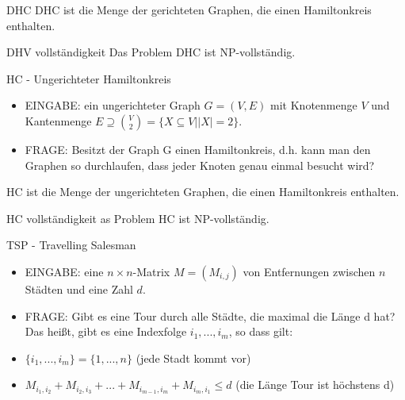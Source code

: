 \documentclass[avery5371]{flashcards}
\begin{document}
\begin{flashcard}[Definition]{DHC}
DHC ist die Menge der gerichteten Graphen, die einen Hamiltonkreis enthalten.
\end{flashcard}

\begin{flashcard}[Satz]{DHV vollständigkeit} 
Das Problem DHC ist NP-vollständig.
\end{flashcard}

\begin{flashcard}{HC - Ungerichteter Hamiltonkreis}
\begin{itemize}
\item EINGABE: ein ungerichteter Graph $G=(V,E)$ mit Knotenmenge $V$ und Kantenmenge $E\supseteq \binom{V}{2} = \{X\subseteq V | |X|=2\}$.
\item FRAGE: Besitzt der Graph G einen Hamiltonkreis, d.h. kann man den Graphen so durchlaufen, dass jeder Knoten genau einmal besucht wird?
\end{itemize}
\end{flashcard}

\begin{flashcard}[Definition]{HC}
ist die Menge der ungerichteten Graphen, die einen Hamiltonkreis enthalten.
\end{flashcard}

\begin{flashcard}[Satz]{HC vollständigkeit}
as Problem HC ist NP-vollständig.
\end{flashcard}

\begin{flashcard}{TSP - Travelling Salesman}
\begin{itemize}
\item EINGABE: eine $n\times n$-Matrix $M = (M_{i,j})$ von Entfernungen zwischen $n$ Städten und eine Zahl $d$.
\item FRAGE: Gibt es eine Tour durch alle Städte, die maximal die Länge d hat? Das heißt, gibt es eine Indexfolge $i_1,...,i_m$, so dass gilt:
\item $\{i_1,...,i_m\} = \{1,...,n\}$ (jede Stadt kommt vor)
\item $M_{i_1,i_2} + M_{i_2,i_3} +...+ M_{i_{m-1},i_m} + M_{i_m,i_1} \leq d$ (die Länge Tour ist höchstens d)
\end{itemize}
\end{flashcard}
\end{document}
